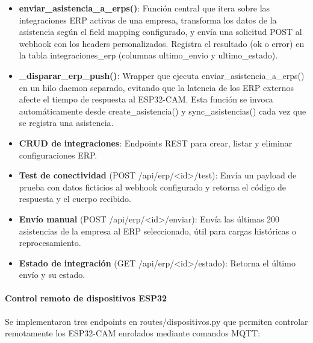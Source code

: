 \begin{itemize}
    \item \textbf{enviar\_asistencia\_a\_erps()}: Función central que itera sobre las integraciones ERP activas de una empresa, transforma los datos de la asistencia según el field mapping configurado, y envía una solicitud POST al webhook con los headers personalizados. Registra el resultado (ok o error) en la tabla integraciones\_erp (columnas ultimo\_envio y ultimo\_estado).

    \item \textbf{\_disparar\_erp\_push()}: Wrapper que ejecuta enviar\_asistencia\_a\_erps() en un hilo daemon separado, evitando que la latencia de los ERP externos afecte el tiempo de respuesta al ESP32-CAM. Esta función se invoca automáticamente desde create\_asistencia() y sync\_asistencias() cada vez que se registra una asistencia.

    \item \textbf{CRUD de integraciones}: Endpoints REST para crear, listar y eliminar configuraciones ERP.

    \item \textbf{Test de conectividad} (POST /api/erp/<id>/test): Envía un payload de prueba con datos ficticios al webhook configurado y retorna el código de respuesta y el cuerpo recibido.

    \item \textbf{Envío manual} (POST /api/erp/<id>/enviar): Envía las últimas 200 asistencias de la empresa al ERP seleccionado, útil para cargas históricas o reprocesamiento.

    \item \textbf{Estado de integración} (GET /api/erp/<id>/estado): Retorna el último envío y su estado.
\end{itemize}

\paragraph{Control remoto de dispositivos ESP32}

Se implementaron tres endpoints en routes/dispositivos.py que permiten controlar remotamente los ESP32-CAM enrolados mediante comandos MQTT:

